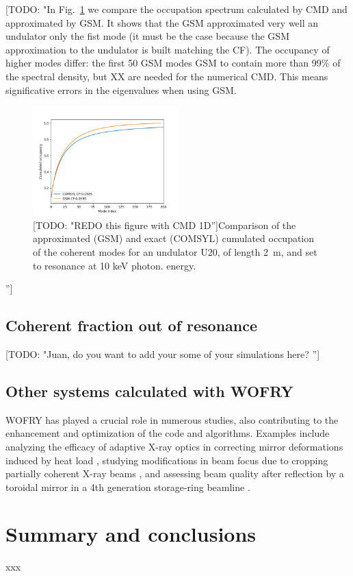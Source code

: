 \documentclass{iopconfser}
\newcommand{\todo}[1]{{\color{red}[TODO: "#1'']}}
\begin{document}
\todo{In Fig.~\ref{fig:GSMvsCOMSYL} we compare the occupation spectrum calculated by CMD and approximated by GSM. It shows that the GSM approximated very well an undulator only the fist mode (it must be the case because the GSM approximation to the undulator is built matching the CF). The occupancy of higher modes differ: the first 50 GSM modes GSM to contain more than 99\% of the spectral density, but XX are needed for the numerical CMD. This means significative errors in the eigenvalues when using GSM. 


\begin{figure}
    \centering
    \includegraphics[width=0.5\textwidth]{figures/FigureGSMvsCOMSYL.png}
    \caption{\todo{REDO this figure with CMD 1D}Comparison of the approximated (GSM) and exact (COMSYL) cumulated occupation of the coherent modes for an undulator U20, of length \SI{2}{\meter}, and set to resonance at 10 keV photon. energy.}
    \label{fig:GSMvsCOMSYL}
\end{figure}
}

\subsection{Coherent fraction out of resonance}
\todo{Juan, do you want to add your some of your simulations here? }



\subsection{Other systems calculated with WOFRY}

WOFRY has played a crucial role in numerous studies, also contributing to the enhancement and optimization of the code and algorithms. Examples include analyzing the efficacy of adaptive X-ray optics in correcting mirror deformations induced by heat load \cite{SanchezdelRio2020}, studying modifications in beam focus due to cropping partially coherent X-ray beams \cite{SanchezdelRio2022EPL}, and assessing beam quality after reflection by a toroidal mirror in a 4th generation storage-ring beamline \cite{ReyesHerrera2023}.

\section{Summary and conclusions}
\label{sec:summary}
xxx









% 


\end{document}

